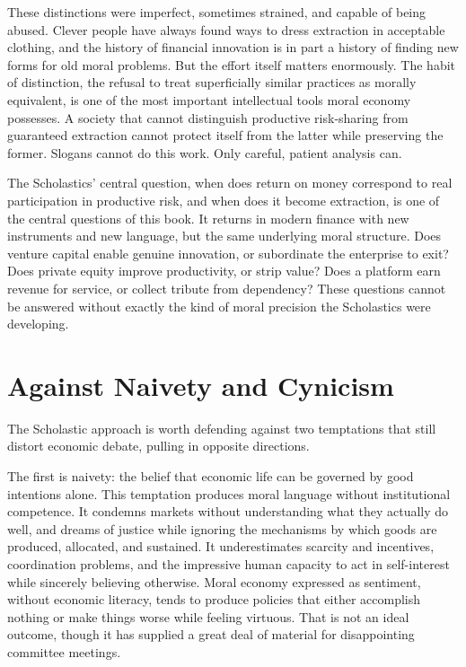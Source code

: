 \documentclass[11pt,a4paper,oneside]{book}
\begin{document}
These distinctions were imperfect, sometimes strained, and capable of being abused. Clever people have always found ways to dress extraction in acceptable clothing, and the history of financial innovation is in part a history of finding new forms for old moral problems. But the effort itself matters enormously. The habit of distinction, the refusal to treat superficially similar practices as morally equivalent, is one of the most important intellectual tools moral economy possesses. A society that cannot distinguish productive risk-sharing from guaranteed extraction cannot protect itself from the latter while preserving the former. Slogans cannot do this work. Only careful, patient analysis can.

The Scholastics' central question, when does return on money correspond to real participation in productive risk, and when does it become extraction, is one of the central questions of this book. It returns in modern finance with new instruments and new language, but the same underlying moral structure. Does venture capital enable genuine innovation, or subordinate the enterprise to exit? Does private equity improve productivity, or strip value? Does a platform earn revenue for service, or collect tribute from dependency? These questions cannot be answered without exactly the kind of moral precision the Scholastics were developing.

\section*{Against Naivety and Cynicism}

The Scholastic approach is worth defending against two temptations that still distort economic debate, pulling in opposite directions.

The first is naivety: the belief that economic life can be governed by good intentions alone. This temptation produces moral language without institutional competence. It condemns markets without understanding what they actually do well, and dreams of justice while ignoring the mechanisms by which goods are produced, allocated, and sustained. It underestimates scarcity and incentives, coordination problems, and the impressive human capacity to act in self-interest while sincerely believing otherwise. Moral economy expressed as sentiment, without economic literacy, tends to produce policies that either accomplish nothing or make things worse while feeling virtuous. That is not an ideal outcome, though it has supplied a great deal of material for disappointing committee meetings.
\end{document}
